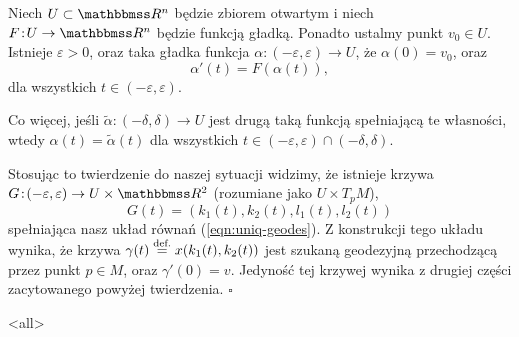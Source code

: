 \begin{frame}

\begin{twierdzenie}
Niech $U\subset \R^n$ będzie zbiorem otwartym i niech $F\colon U\to \R^n$ będzie funkcją gładką. Ponadto ustalmy punkt $v_0\in U$. Istnieje $\varepsilon>0$, oraz taka gładka funkcja $\alpha\colon (-\varepsilon,\varepsilon)\to U$, że $\alpha(0)=v_0$, oraz \[\alpha'(t)=F(\alpha(t)),\]dla wszystkich $t\in (-\varepsilon,\varepsilon)$.

\pause Co więcej, jeśli $\widetilde{\alpha}\colon (-\delta,\delta)\to U$ jest drugą taką funkcją spełniającą te własności, wtedy $\alpha(t)=\widetilde{\alpha}(t)$ dla wszystkich $t\in (-\varepsilon,\varepsilon)\cap(-\delta,\delta)$.

\end{twierdzenie}


\end{frame}
\begin{frame}

Stosując to twierdzenie do naszej sytuacji widzimy, że istnieje krzywa $G\colon (-\varepsilon,\varepsilon)\to U\times \R^2$ (rozumiane jako $U\times T_pM$), \[G(t)=(k_1(t),k_2(t),l_1(t),l_2(t))\] spełniająca nasz układ równań (\ref{eqn:uniq-geodes}). \pause Z konstrukcji tego układu wynika, że krzywa $\gamma(t)\define x(k_1(t),k_2(t))$ jest szukaną geodezyjną przechodzącą przez punkt $p\in M$, oraz $\gamma'(0)=v$. Jedyność tej krzywej wynika z drugiej części zacytowanego powyżej twierdzenia.
\hfill $\square$

\end{frame}

\mode<all> 
